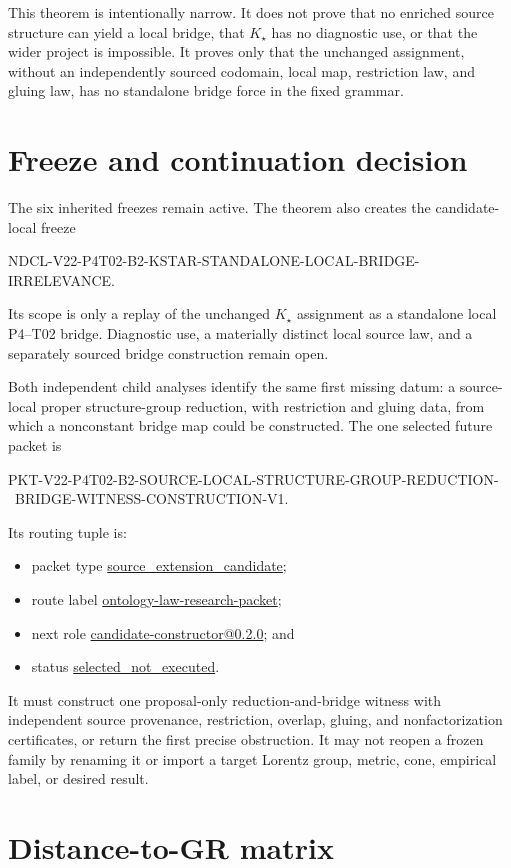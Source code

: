 \documentclass[11pt]{article}
\newcommand{\Kstar}{K_{\star}}
\begin{document}
This theorem is intentionally narrow.  It does not prove that no enriched
source structure can yield a local bridge, that $\Kstar$ has no diagnostic
use, or that the wider project is impossible.  It proves only that the
unchanged assignment, without an independently sourced codomain, local map,
restriction law, and gluing law, has no standalone bridge force in the fixed
grammar.

\section{Freeze and continuation decision}

The six inherited freezes remain active.  The theorem also creates the
candidate-local freeze
\begin{center}
\small\ttfamily
NDCL-V22-P4T02-B2-KSTAR-STANDALONE-LOCAL-BRIDGE-IRRELEVANCE.
\end{center}
Its scope is only a replay of the unchanged $\Kstar$ assignment as a
standalone local P4--T02 bridge.  Diagnostic use, a materially distinct local
source law, and a separately sourced bridge construction remain open.

Both independent child analyses identify the same first missing datum: a
source-local proper structure-group reduction, with restriction and gluing
data, from which a nonconstant bridge map could be constructed.  The one
selected future packet is
\begin{center}
\small\ttfamily
PKT-V22-P4T02-B2-SOURCE-LOCAL-STRUCTURE-GROUP-REDUCTION-\
BRIDGE-WITNESS-CONSTRUCTION-V1.
\end{center}
Its routing tuple is:
\begin{itemize}[leftmargin=2em]
  \item packet type \url{source_extension_candidate};
  \item route label \url{ontology-law-research-packet};
  \item next role \url{candidate-constructor@0.2.0}; and
  \item status \url{selected_not_executed}.
\end{itemize}
It must construct one proposal-only reduction-and-bridge witness with
independent source provenance, restriction, overlap, gluing, and
nonfactorization certificates, or return the first precise obstruction.  It
may not reopen a frozen family by renaming it or import a target Lorentz group,
metric, cone, empirical label, or desired result.

\section{Distance-to-GR matrix}
\end{document}
